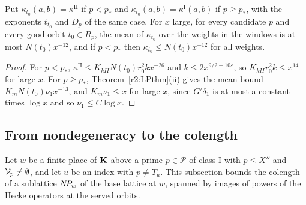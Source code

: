 \begin{corollary}\label{r2:meankappa}
Put $\kappa_{t_0}(a,b)=\kappa^{\mathrm{II}}$ if $p<p_*$ and $\kappa_{t_0}(a,b)=\kappa^{\mathrm I}(a,b)$ if $p\ge p_*$, with the exponents $t_{t_0}$ and $D_p$ of the same case. For $x$ large, for every candidate $p$ and every good orbit $t_0\in R_p$, the mean of $\kappa_{t_0}$ over the weights in the windows is at most $N(t_0)x^{-12}$, and if $p<p_*$ then $\kappa_{t_0}\le N(t_0)x^{-12}$ for all weights.
\end{corollary}

\begin{proof}
For $p<p_*$, $\kappa^{\mathrm{II}}\le K_{kII}N(t_0)r_0^2kx^{-26}$ and $k\le2x^{9/2+10\varepsilon}$, so $K_{kII}r_0^2k\le x^{14}$ for large $x$. For $p\ge p_*$, Theorem~\ref{r2:LPthm}(ii) gives the mean bound $K_mN(t_0)\nu_1x^{-13}$, and $K_m\nu_1\le x$ for large $x$, since $G'\delta_1$ is at most a constant times $\log x$ and so $\nu_1\le C\log x$.
\end{proof}
\subsection{From nondegeneracy to the colength}\label{r2:sec:colength}

Let $w$ be a finite place of $\mathbf K$ above a prime $p\in\mathcal P$ of class I with $p\le X''$ and $\mathcal V_p\ne\emptyset$, and let $u$ be an index with $p\ne T_u$. This subsection bounds the colength of a sublattice $N\!P_w$ of the base lattice at $w$, spanned by images of powers of the Hecke operators at the served orbits.

